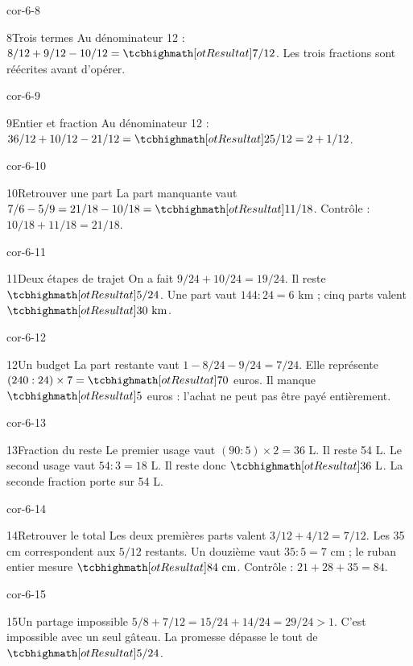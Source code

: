 \begin{blocLivre}{cor-6-8}\begin{corrige}{8}{Trois termes}
Au dénominateur 12 : $8/12+9/12-10/12=\res{7/12}$. Les trois fractions sont réécrites avant d’opérer.
\end{corrige}\end{blocLivre}
\begin{blocLivre}{cor-6-9}\begin{corrige}{9}{Entier et fraction}
Au dénominateur 12 : $36/12+10/12-21/12=\res{25/12=2+1/12}$.
\end{corrige}\end{blocLivre}
\begin{blocLivre}{cor-6-10}\begin{corrige}{10}{Retrouver une part}
La part manquante vaut $7/6-5/9=21/18-10/18=\res{11/18}$. Contrôle : $10/18+11/18=21/18$.
\end{corrige}\end{blocLivre}
\begin{blocLivre}{cor-6-11}\begin{corrige}{11}{Deux étapes de trajet}
On a fait $9/24+10/24=19/24$. Il reste $\res{5/24}$. Une part vaut $144:24=6$ km ; cinq parts valent $\res{30\ \mathrm{km}}$.
\end{corrige}\end{blocLivre}
\begin{blocLivre}{cor-6-12}\begin{corrige}{12}{Un budget}
La part restante vaut $1-8/24-9/24=7/24$. Elle représente $(240:24)\times7=\res{70}$ euros. Il manque $\res5$ euros : l’achat ne peut pas être payé entièrement.
\end{corrige}\end{blocLivre}
\begin{blocLivre}{cor-6-13}\begin{corrige}{13}{Fraction du reste}
Le premier usage vaut $(90:5)\times2=36$ L. Il reste 54 L. Le second usage vaut $54:3=18$ L. Il reste donc $\res{36\ \mathrm L}$. La seconde fraction porte sur 54 L.
\end{corrige}\end{blocLivre}
\begin{blocLivre}{cor-6-14}\begin{corrige}{14}{Retrouver le total}
Les deux premières parts valent $3/12+4/12=7/12$. Les 35 cm correspondent aux $5/12$ restants. Un douzième vaut $35:5=7$ cm ; le ruban entier mesure $\res{84\ \mathrm{cm}}$. Contrôle : $21+28+35=84$.
\end{corrige}\end{blocLivre}
\begin{blocLivre}{cor-6-15}\begin{corrige}{15}{Un partage impossible}
$5/8+7/12=15/24+14/24=29/24>1$. C’est impossible avec un seul gâteau. La promesse dépasse le tout de $\res{5/24}$.
\end{corrige}\end{blocLivre}
